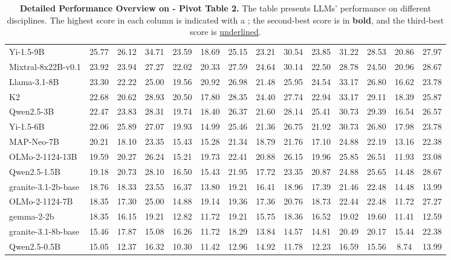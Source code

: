 {\begin{table}[H]
{\begin{tabular}{lccccccccccccc}
\rowcolor{color32}
Yi-1.5-9B& 25.77& 26.12& 34.71& 23.59& 18.69& 25.15& 23.21& 30.54& 23.85& 31.22& 28.53& 20.86& 27.97 \\
\rowcolor{color32}
Mixtral-8x22B-v0.1& 23.92& 23.94& 27.27& 22.02& 20.33& 27.59& 24.64& 30.14& 22.50& 28.78& 24.50& 20.96& 28.67 \\
\rowcolor{color32}
Llama-3.1-8B& 23.30& 22.22& 25.00& 19.56& 20.92& 26.98& 21.48& 25.95& 24.54& 33.17& 26.80& 16.62& 23.78 \\
\rowcolor{color32}
K2& 22.68& 20.62& 28.93& 20.50& 17.80& 28.35& 24.40& 27.74& 22.94& 33.17& 29.11& 18.39& 25.87 \\
\rowcolor{color32}
Qwen2.5-3B& 22.47& 23.83& 28.31& 19.74& 18.40& 26.37& 21.60& 28.14& 25.41& 30.73& 29.39& 16.54& 26.57 \\
\rowcolor{color32}
Yi-1.5-6B& 22.06& 25.89& 27.07& 19.93& 14.99& 25.46& 21.36& 26.75& 21.92& 30.73& 26.80& 17.98& 23.78 \\
\rowcolor{color32}
MAP-Neo-7B& 20.21& 18.10& 23.35& 15.43& 15.28& 21.34& 18.79& 21.76& 17.10& 24.88& 22.19& 13.16& 22.38 \\
\rowcolor{color32}
OLMo-2-1124-13B& 19.59& 20.27& 26.24& 15.21& 19.73& 22.41& 20.88& 26.15& 19.96& 25.85& 26.51& 11.93& 23.08 \\
\rowcolor{color32}
Qwen2.5-1.5B& 19.18& 20.73& 28.10& 16.50& 15.43& 21.95& 17.72& 23.35& 20.87& 24.88& 25.65& 14.48& 28.67 \\
\rowcolor{color32}
granite-3.1-2b-base& 18.76& 18.33& 23.55& 16.37& 13.80& 19.21& 16.41& 18.96& 17.39& 21.46& 22.48& 14.48& 13.99 \\
\rowcolor{color32}
OLMo-2-1124-7B& 18.35& 17.30& 25.00& 14.88& 19.14& 19.36& 17.36& 20.76& 18.73& 22.44& 22.48& 11.72& 27.27 \\
\rowcolor{color32}
gemma-2-2b& 18.35& 16.15& 19.21& 12.82& 11.72& 19.21& 15.75& 18.36& 16.52& 19.02& 19.60& 11.41& 12.59 \\
\rowcolor{color32}
granite-3.1-8b-base& 15.46& 17.87& 15.08& 16.26& 11.72& 18.29& 13.84& 14.57& 14.81& 20.49& 20.17& 15.44& 22.38 \\
\rowcolor{color32}
Qwen2.5-0.5B& 15.05& 12.37& 16.32& 10.30& 11.42& 12.96& 14.92& 11.78& 12.23& 16.59& 15.56& 8.74& 13.99 \\

\bottomrule
\end{tabular}
}
\captionsetup{font=footnotesize}
\caption{\textbf{Detailed Performance Overview on \benchmark - Pivot Table 2.} 
The table presents LLMs' performance on different disciplines. The highest score in each column is indicated with a ; the second-best score is in \textbf{bold}, and the third-best score is \underline{underlined}.}
\label{performance2_all}
\end{table}
}

